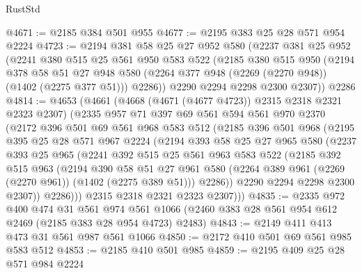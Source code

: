 \begin{lexlean}{RustStd}
\begin{coremodule}
@4671 := @2185 @384 @501 @955
@4677 := @2195 @383 @25 @28 @571 @954 @2224
@4723 := @2194
    @381
    @58
    @25
    @27
    @952
    @580
    (@2237
      @381
      @25
      @952
      (@2241
        @380
        @515
        @25
        @561
        @950
        @583
        @522
        (@2185
          @380
          @515
          @950
          (@2194
            @378
            @58
            @51
            @27
            @948
            @580
            (@2264 @377 @948 (@2269 (@2270 @948)) (@1402 (@2275 @377 @51)))
            @2286))
        @2290
        @2294
        @2298
        @2300
        @2307))
    @2286
@4814 := @4653
    (@4661
      (@4668 (@4671 (@4677 @4723)) @2315 @2318 @2321 @2323 @2307)
      (@2335
        @957
        @71
        @397
        @69
        @561
        @594
        @561
        @970
        @2370
        (@2172
          @396
          @501
          @69
          @561
          @968
          @583
          @512
          (@2185
            @396
            @501
            @968
            (@2195
              @395
              @25
              @28
              @571
              @967
              @2224
              (@2194
                @393
                @58
                @25
                @27
                @965
                @580
                (@2237
                  @393
                  @25
                  @965
                  (@2241
                    @392
                    @515
                    @25
                    @561
                    @963
                    @583
                    @522
                    (@2185
                      @392
                      @515
                      @963
                      (@2194
                        @390
                        @58
                        @51
                        @27
                        @961
                        @580
                        (@2264 @389 @961 (@2269 (@2270 @961)) (@1402 (@2275 @389 @51)))
                        @2286))
                    @2290
                    @2294
                    @2298
                    @2300
                    @2307))
                @2286)))
          @2315
          @2318
          @2321
          @2323
          @2307)))
@4835 := @2335
    @972
    @400
    @474
    @31
    @561
    @974
    @561
    @1066
    (@2460 @383 @28 @561 @954 @612 @2469 (@2185 @383 @28 @954 @4723) @2483)
@4843 := @2149 @411 @413 @473 @31 @561 @987 @561 @1066
@4850 := @2172 @410 @501 @69 @561 @985 @583 @512
@4853 := @2185 @410 @501 @985
@4859 := @2195 @409 @25 @28 @571 @984 @2224

\end{coremodule}
\end{lexlean}
